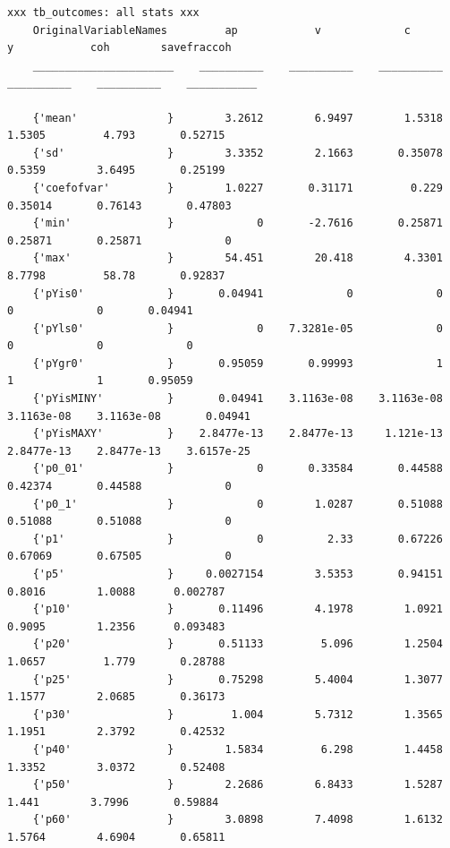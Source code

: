 \documentclass[
]{book}
\begin{document}
\begin{verbatim}
xxx tb_outcomes: all stats xxx
    OriginalVariableNames         ap            v             c             y            coh        savefraccoh
    ______________________    __________    __________    __________    __________    __________    ___________

    {'mean'              }        3.2612        6.9497        1.5318        1.5305         4.793       0.52715 
    {'sd'                }        3.3352        2.1663       0.35078        0.5359        3.6495       0.25199 
    {'coefofvar'         }        1.0227       0.31171         0.229       0.35014       0.76143       0.47803 
    {'min'               }             0       -2.7616       0.25871       0.25871       0.25871             0 
    {'max'               }        54.451        20.418        4.3301        8.7798         58.78       0.92837 
    {'pYis0'             }       0.04941             0             0             0             0       0.04941 
    {'pYls0'             }             0    7.3281e-05             0             0             0             0 
    {'pYgr0'             }       0.95059       0.99993             1             1             1       0.95059 
    {'pYisMINY'          }       0.04941    3.1163e-08    3.1163e-08    3.1163e-08    3.1163e-08       0.04941 
    {'pYisMAXY'          }    2.8477e-13    2.8477e-13     1.121e-13    2.8477e-13    2.8477e-13    3.6157e-25 
    {'p0_01'             }             0       0.33584       0.44588       0.42374       0.44588             0 
    {'p0_1'              }             0        1.0287       0.51088       0.51088       0.51088             0 
    {'p1'                }             0          2.33       0.67226       0.67069       0.67505             0 
    {'p5'                }     0.0027154        3.5353       0.94151        0.8016        1.0088      0.002787 
    {'p10'               }       0.11496        4.1978        1.0921        0.9095        1.2356      0.093483 
    {'p20'               }       0.51133         5.096        1.2504        1.0657         1.779       0.28788 
    {'p25'               }       0.75298        5.4004        1.3077        1.1577        2.0685       0.36173 
    {'p30'               }         1.004        5.7312        1.3565        1.1951        2.3792       0.42532 
    {'p40'               }        1.5834         6.298        1.4458        1.3352        3.0372       0.52408 
    {'p50'               }        2.2686        6.8433        1.5287         1.441        3.7996       0.59884 
    {'p60'               }        3.0898        7.4098        1.6132        1.5764        4.6904       0.65811 

\end{verbatim}
\end{document}
